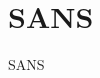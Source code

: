 \documentclass[\main/dresen_thesis.tex]{subfiles}
\begin{document}
  \section{SANS}
    \label{app:methods:sans}
    SANS
\end{document}

